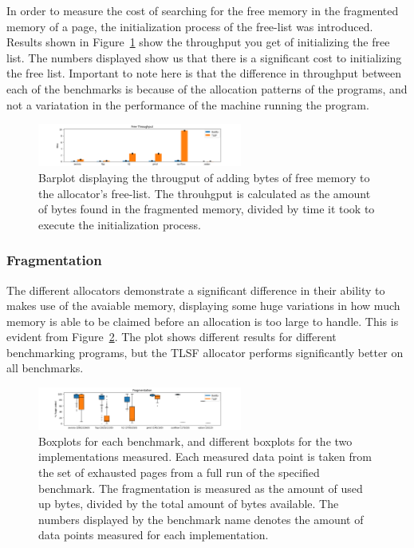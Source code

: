 In order to measure the cost of searching for the free memory in the fragmented memory of a page, the initialization process of the free-list was introduced. Results shown in Figure~\ref{fig:free-list-initialization} show the throughput you get of initializing the free list. The numbers displayed show us that there is a significant cost to initializing the free list. Important to note here is that the difference in throughput between each of the benchmarks is because of the allocation patterns of the programs, and not a variatation in the performance of the machine running the program. 

\begin{figure}[H]
\centering
\includegraphics[width=0.6\textwidth]{figures/free_throughput.png}
\caption{Barplot displaying the througput of adding bytes of free memory to the allocator's free-list. The throuhgput is calculated as the amount of bytes found in the fragmented memory, divided by time it took to execute the initialization process.}
\label{fig:free-list-initialization}
\end{figure}

\subsubsection{Fragmentation}
The different allocators demonstrate a significant difference in their ability to makes use of the avaiable memory, displaying some huge variations in how much memory is able to be claimed before an allocation is too large to handle. This is evident from Figure~\ref*{fig:memory-fragmentation}. The plot shows different results for different benchmarking programs, but the TLSF allocator performs significantly better on all benchmarks.


\begin{figure}[H]
\centering
\includegraphics[width=0.6\textwidth]{figures/fl_fragmentation.png}
\caption{Boxplots for each benchmark, and different boxplots for the two implementations measured. Each measured data point is taken from the set of exhausted pages from a full run of the specified benchmark. The fragmentation is measured as the amount of used up bytes, divided by the total amount of bytes available. The numbers displayed by the benchmark name denotes the amount of data points measured for each implementation.}
\label{fig:memory-fragmentation}
\end{figure}

